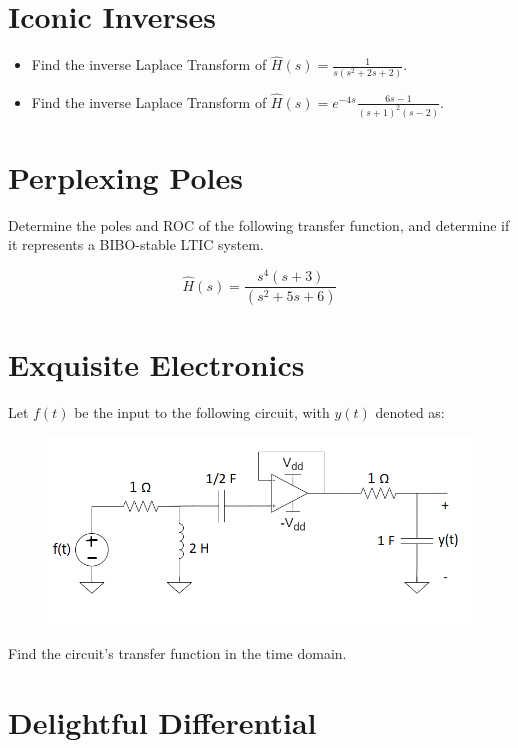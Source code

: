 \documentclass{article}
\begin{document}
\vfill

\section{Iconic Inverses}

\begin{itemize}
    \item Find the inverse Laplace Transform of $\hat{H}(s) = \frac{1}{s(s^2 + 2s + 2)}$.
    \item Find the inverse Laplace Transform of $\hat{H}(s) = e^{-4s}\frac{6s-1}{(s+1)^2(s-2)}$.
\end{itemize}

\vfill

\newpage
\section{Perplexing Poles}

Determine the poles and ROC of the following transfer function, and determine if it represents a BIBO-stable LTIC system.

$$\hat{H}(s) = \frac{s^4(s + 3)}{(s^2 + 5s + 6)}$$

\vspace{4cm}

\section{Exquisite Electronics}

Let $f(t)$ be the input to the following circuit, with $y(t)$ denoted as:

\begin{figure}[h]
\begin{center}
    \includegraphics[width=0.5 
    \textwidth]{figures/circuit7.png}
\end{center}
\end{figure}

Find the circuit's transfer function in the time domain.
\newpage

\section{Delightful Differential}
\end{document}
